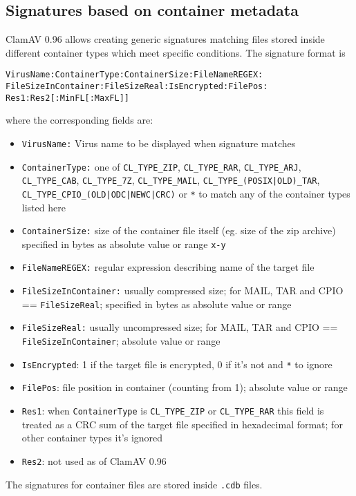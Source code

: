 \documentclass[a4paper,titlepage,12pt]{article}
\begin{document}
    \subsection{Signatures based on container metadata}
    ClamAV 0.96 allows creating generic signatures matching files stored
    inside different container types which meet specific conditions.
    The signature format is
\begin{verbatim}
VirusName:ContainerType:ContainerSize:FileNameREGEX:
FileSizeInContainer:FileSizeReal:IsEncrypted:FilePos:
Res1:Res2[:MinFL[:MaxFL]]
\end{verbatim}
    where the corresponding fields are:
    \begin{itemize}
	\item \verb+VirusName:+ Virus name to be displayed when signature matches
	\item \verb+ContainerType:+ one of \verb+CL_TYPE_ZIP+, \verb+CL_TYPE_RAR+,
	\verb+CL_TYPE_ARJ+,\\
	\verb+CL_TYPE_CAB+, \verb+CL_TYPE_7Z+, \verb+CL_TYPE_MAIL+, \verb+CL_TYPE_(POSIX|OLD)_TAR+,\\
	\verb+CL_TYPE_CPIO_(OLD|ODC|NEWC|CRC)+ or \verb+*+ to match
	any of the container types listed here
	\item \verb+ContainerSize:+ size of the container file itself (eg. size of
	the zip archive) specified in bytes as absolute value or range \verb+x-y+
	\item \verb+FileNameREGEX:+ regular expression describing name of the target file
	\item \verb+FileSizeInContainer:+ usually compressed size; for MAIL, TAR and CPIO ==
	\verb+FileSizeReal+; specified in bytes as absolute value or range
	\item \verb+FileSizeReal:+ usually uncompressed size; for MAIL, TAR and CPIO ==
	\verb+FileSizeInContainer+; absolute value or range
	\item \verb+IsEncrypted+: 1 if the target file is encrypted, 0 if it's not and
	\verb+*+ to ignore
	\item \verb+FilePos+: file position in container (counting from 1); absolute value
	or range
	\item \verb+Res1+: when \verb+ContainerType+ is \verb+CL_TYPE_ZIP+ or
	\verb+CL_TYPE_RAR+ this field is treated as a CRC sum of the target file
	specified in hexadecimal format; for other container types it's ignored
	\item \verb+Res2+: not used as of ClamAV 0.96
    \end{itemize}
    The signatures for container files are stored inside \verb+.cdb+ files.
\end{document}
